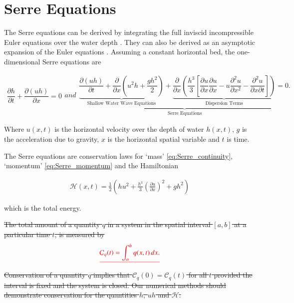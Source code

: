 \documentclass[times]{elsarticle}
\providecommand{\DIFdel}[1]{{\protect\color{red}\sout{#1}}}                      %
\providecommand{\DIFdelbegin}{} %
\begin{document}
\section{Serre Equations}
\label{section:Serre Equations}
The Serre equations can be derived by integrating the full inviscid incompressible Euler equations over the water depth \cite{Su-Gardener-1969-536}. They can also be derived as an asymptotic expansion of the Euler equations \cite{Bonneton-Lannes-2009-16601}. Assuming a constant horizontal bed, the one-dimensional Serre equations are \cite{Guyenne-etal-2014-169}
\begin{linenomath*}
\begin{subequations}\label{eq:Serre_nonconservative_form}
\begin{gather}
\dfrac{\partial h}{\partial t} + \dfrac{\partial (uh)}{\partial x} = 0
\label{eq:Serre_continuity}
\end{gather}
and
\begin{gather}
\underbrace{\underbrace{\dfrac{\partial (uh)}{\partial t} + \dfrac{\partial}{\partial x} \left ( u^2h + \dfrac{gh^2}{2}\right )}_{\text{Shallow Water Wave Equations}} + \underbrace{\dfrac{\partial}{\partial x} \left (  \dfrac{h^3}{3} \left [ \dfrac{\partial u }{\partial x} \dfrac{\partial u}{\partial x} - u\dfrac{\partial^2 u}{\partial x^2}  - \dfrac{\partial^2 u}{\partial x \partial t}\right ] \right )}_{\text{Dispersion Terms}} = 0.}_{\text{Serre Equations}}
\label{eq:Serre_momentum}
\end{gather}
\end{subequations}
\end{linenomath*}
Where $u(x,t)$ is the horizontal velocity over the depth of water $h(x,t)$, $g$ is the acceleration due to gravity, $x$ is the horizontal spatial variable and $t$ is time. 

The Serre equations are conservation laws for `mass' \eqref{eq:Serre_continuity}, `momentum' \eqref{eq:Serre_momentum} and the Hamiltonian \cite{Li-Y-2002,Green-Naghdi-1976-237}
\begin{linenomath*}
	\begin{gather}
	\label{eqn:Hamildef}
	\mathcal{H}(x,t) = \frac{1}{2} \left(hu^2 + \frac{h^3}{3} \left(\frac{\partial u}{\partial x}\right)^2 + gh^2\right)
	\end{gather}
\end{linenomath*}
which is the total energy.
\DIFdelbegin %

\DIFdel{The total amount of a quantity $q$ in a system in the spatial interval $[a,b]$ at a particular time $t$, is measured by
}%
\begin{align*}
\DIFdel{%
\mathcal{C}_q(t) = \int_{a}^{b} q(x,t)\, dx .
}\end{align*}
\DIFdel{Conservation of a quantity $q$ implies that $\mathcal{C}_{q}(0) = \mathcal{C}_{q}(t)$ for all $t$ provided the interval is fixed and the system is closed. Our numerical methods should demonstrate conservation for the quantities $h$, $uh$ and $\mathcal{H}$.
}%
\end{document}
